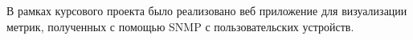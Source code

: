 В рамках курсового проекта было реализовано веб приложение для визуализации метрик, полученных
с помощью SNMP с пользовательских устройств.

\printbibliography[title={\centering\textbf{Список использованных источников}}]